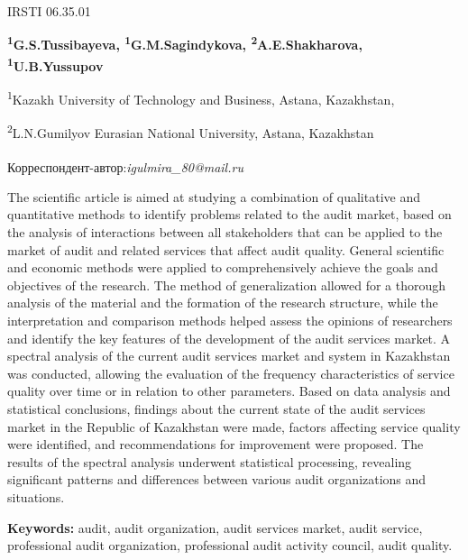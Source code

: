 IRSTI 06.35.01

\begin{articleheader}

{\bfseries \textsuperscript{1}G.S.Tussibayeva\textsuperscript{\envelope},
\textsuperscript{1}G.M.Sagindykova, \textsuperscript{2}A.E.Shakharova,
\textsuperscript{1}U.B.Yussupov}
\end{articleheader}

\begin{affiliation}

\textsuperscript{1}Kazakh University of Technology and Business, Astana,
Kazakhstan,

\textsuperscript{2}L.N.Gumilyov Eurasian National University, Astana,
Kazakhstan

\raggedright\textbf{\textsuperscript{\envelope}}Корреспондент-автор:\emph{igulmira\_80@mail.ru}
\end{affiliation}

The scientific article is aimed at studying a combination of qualitative
and quantitative methods to identify problems related to the audit
market, based on the analysis of interactions between all stakeholders
that can be applied to the market of audit and related services that
affect audit quality. General scientific and economic methods were
applied to comprehensively achieve the goals and objectives of the
research. The method of generalization allowed for a thorough analysis
of the material and the formation of the research structure, while the
interpretation and comparison methods helped assess the opinions of
researchers and identify the key features of the development of the
audit services market. A spectral analysis of the current audit services
market and system in Kazakhstan was conducted, allowing the evaluation
of the frequency characteristics of service quality over time or in
relation to other parameters. Based on data analysis and statistical
conclusions, findings about the current state of the audit services
market in the Republic of Kazakhstan were made, factors affecting
service quality were identified, and recommendations for improvement
were proposed. The results of the spectral analysis underwent
statistical processing, revealing significant patterns and differences
between various audit organizations and situations.

\textbf{Keywords:} audit, audit organization, audit services market,
audit service, professional audit organization, professional audit
activity council, audit quality.

